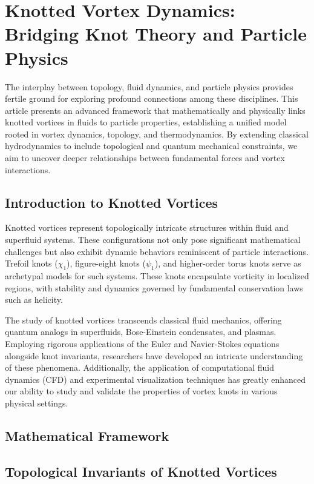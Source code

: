 
\section{Knotted Vortex Dynamics: Bridging Knot Theory and Particle Physics}


The interplay between topology, fluid dynamics, and particle physics provides fertile ground for exploring profound connections among these disciplines. This article presents an advanced framework that mathematically and physically links knotted vortices in fluids to particle properties, establishing a unified model rooted in vortex dynamics, topology, and thermodynamics. By extending classical hydrodynamics to include topological and quantum mechanical constraints, we aim to uncover deeper relationships between fundamental forces and vortex interactions.


\subsection*{Introduction to Knotted Vortices}


Knotted vortices represent topologically intricate structures within fluid and superfluid systems. These configurations not only pose significant mathematical challenges but also exhibit dynamic behaviors reminiscent of particle interactions. Trefoil knots ($\chi_1$), figure-eight knots ($\psi_1$), and higher-order torus knots serve as archetypal models for such systems. These knots encapsulate vorticity in localized regions, with stability and dynamics governed by fundamental conservation laws such as helicity.


The study of knotted vortices transcends classical fluid mechanics, offering quantum analogs in superfluids, Bose-Einstein condensates, and plasmas. Employing rigorous applications of the Euler and Navier-Stokes equations alongside knot invariants, researchers have developed an intricate understanding of these phenomena. Additionally, the application of computational fluid dynamics (CFD) and experimental visualization techniques has greatly enhanced our ability to study and validate the properties of vortex knots in various physical settings.


\subsection*{Mathematical Framework}


\subsection*{Topological Invariants of Knotted Vortices}


